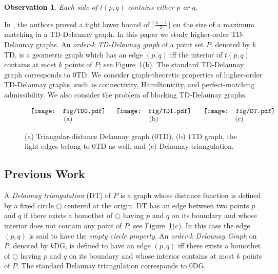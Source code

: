 \documentclass[11pt,a4paper]{article}
\newcommand{\kTD}[2]{$#1$\text{-}TD#2}
\newcommand{\kDT}[2]{$#1$\text{-}DG#2}
\newtheorem{observation}{Observation}
\begin{document}
\begin{observation}
\label{side-point-obs}
 Each side of $t(p,q)$ contains either $p$ or $q$.
\end{observation}

In \cite{Babu2013}, the authors proved a tight lower bound of $\lceil\frac{n-1}{3}\rceil$ on the size of a maximum matching in a TD-Delaunay graph. In this paper we study higher-order TD-Delaunay graphs. An {\em order-k TD-Delaunay graph} of a point set $P$, denoted by \kTD{k}{}, is a geometric graph which has an edge $(p,q)$ iff the interior of $t(p,q)$ contains at most $k$ points of $P$; see Figure~\ref{TD}(b). The standard TD-Delaunay graph corresponds to \kTD{0}{}. We consider graph-theoretic properties of higher-order TD-Delaunay graphs, such as connectivity, Hamiltonicity, and perfect-matching admissibility. We also consider the problem of blocking TD-Delaunay graphs.

\begin{figure}[htb]
  \centering
\setlength{\tabcolsep}{0in}
  $\begin{tabular}{ccc}
\multicolumn{1}{m{.33\columnwidth}}{\centering\texttt{[image: fig/TD0.pdf]}}
&\multicolumn{1}{m{.33\columnwidth}}{\centering\texttt{[image: fig/TD1.pdf]}} &\multicolumn{1}{m{.33\columnwidth}}{\centering\texttt{[image: fig/DT.pdf]}}
\\
(a) & (b)& (c)
\end{tabular}$
  \caption{(a) Triangular-distance Delaunay graph (\kTD{0}{}), (b) \kTD{1}{} graph, the light edges belong to \kTD{0}{} as well, and (c) Delaunay triangulation.}
\label{TD}
\end{figure}

\subsection{Previous Work}
\label{previous-work}
A {\em Delaunay triangulation} (DT) of $P$ is a graph whose distance function is defined by a fixed circle {\footnotesize $\bigcirc$} centered at the origin. DT has an edge between two points $p$ and $q$ if there exists a homothet of {\footnotesize $\bigcirc$} having $p$ and $q$ on its boundary and whose interior does not contain any point of $P$; see Figure~\ref{TD}(c). In this case the edge $(p,q)$ is said to have the {\em empty circle property}. An {\em order-k
Delaunay Graph} on $P$, denoted by \kDT{k}{}, is defined to have an edge $(p, q)$ iff there exists a homothet of {\footnotesize $\bigcirc$} having $p$ and $q$ on its boundary and whose interior contains at most $k$ points of $P$. The standard Delaunay triangulation corresponds to \kDT{0}{}.  
\end{document}
